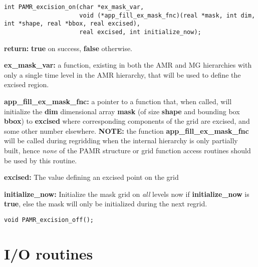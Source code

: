\documentclass[aps,amssymb,unsortedaddress,nofootinbib]{revtex4}
\def\lsep{\itemsep 0.05in}
\begin{document}
\begin{verbatim}
int PAMR_excision_on(char *ex_mask_var,
                     void (*app_fill_ex_mask_fnc)(real *mask, int dim, int *shape, real *bbox, real excised),
                     real excised, int initialize_now);
\end{verbatim}
\begin{list}{}{\lsep}
\item {\bf return:} {\bf true} on success, {\bf false} otherwise.
\item {\bf *ex\_mask\_var:} a function, existing in both the AMR and MG hierarchies
                            with only a single time level in the AMR hierarchy, that will
                            be used to define the excised region.
\item {\bf *app\_fill\_ex\_mask\_fnc:} a pointer to a function that, when called, will initialize
                            the {\bf dim} dimensional array {\bf mask} (of size {\bf shape} and
                            bounding box {\bf bbox}) to {\bf excised} where corresponding components
                            of the grid are excised, and some other number elsewhere.
                            {\bf NOTE:} the function {\bf app\_fill\_ex\_mask\_fnc} 
                            will be called during regridding when
                            the internal hierarchy is only partially built, hence
                            {\em none} of the PAMR structure or grid function access routines 
                            should be used by this routine.
\item {\bf excised:}        The value defining an excised point on the grid
\item {\bf initialize\_now:} Initialize the mask grid on {\em all} levels now if {\bf initialize\_now}
                            is {\bf true}, else the mask will only be initialized during the next regrid.
\end{list}


\begin{verbatim}
void PAMR_excision_off();
\end{verbatim}


\section{I/O routines}
\end{document}
